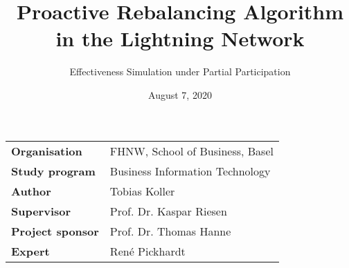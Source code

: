 \documentclass[final]{fhnwreport}       %
\title{Proactive Rebalancing Algorithm in the Lightning Network}                          %
\author{Effectiveness Simulation under Partial Participation}                %
\date{August 7, 2020}                   %
\begin{document}
\maketitle

\vspace*{-1cm}                            %
\vfill
{
\renewcommand\arraystretch{2}
\begin{center}
\begin{tabular}{>{\bf}p{4cm} l}
Organisation                  &    FHNW, School of Business, Basel\\
Study program                 &    Business Information Technology\\
Author                        &    Tobias Koller\\
Supervisor                    &    Prof. Dr. Kaspar Riesen\\
Project sponsor               &    Prof. Dr. Thomas Hanne\\
Expert                        &    René Pickhardt
\end{tabular}
\end{center}
}
\clearpage
\end{document}
